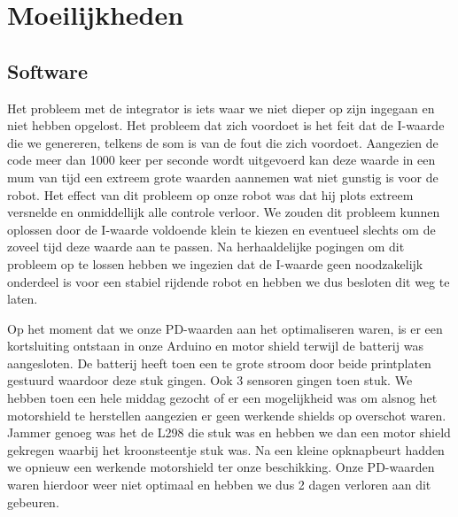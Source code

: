 \chapter{Moeilijkheden}\label{Moeilijkheden}
\section{Software}
Het probleem met de integrator is iets waar we niet dieper op zijn ingegaan en niet hebben opgelost. Het probleem dat zich voordoet is het feit dat de I-waarde die we genereren, telkens de som is van de fout die zich voordoet. Aangezien de code meer dan 1000 keer per seconde wordt uitgevoerd kan deze waarde in een mum van tijd een extreem grote waarden aannemen wat niet gunstig is voor de robot. Het effect van dit probleem op onze robot was dat hij plots extreem versnelde en onmiddellijk alle controle verloor. We zouden dit probleem kunnen oplossen door de I-waarde voldoende klein te kiezen en eventueel slechts om de zoveel tijd deze waarde aan te passen. Na herhaaldelijke pogingen om dit probleem op te lossen hebben we ingezien dat de I-waarde geen noodzakelijk onderdeel is voor een stabiel rijdende robot en hebben we dus besloten dit weg te laten.

Op het moment dat we onze PD-waarden aan het optimaliseren waren, is er een kortsluiting ontstaan in onze Arduino en motor shield terwijl de batterij was aangesloten. De batterij heeft toen een te grote stroom door beide printplaten gestuurd waardoor deze stuk gingen. Ook 3 sensoren gingen toen stuk. We hebben toen een hele middag gezocht of er een mogelijkheid was om alsnog het motorshield te herstellen aangezien er geen werkende shields op overschot waren. Jammer genoeg was het de L298 die stuk was en hebben we dan een motor shield gekregen waarbij het kroonsteentje stuk was. Na een kleine opknapbeurt hadden we opnieuw een werkende motorshield ter onze beschikking. Onze PD-waarden waren hierdoor weer niet optimaal en hebben we dus 2 dagen verloren aan dit gebeuren.

